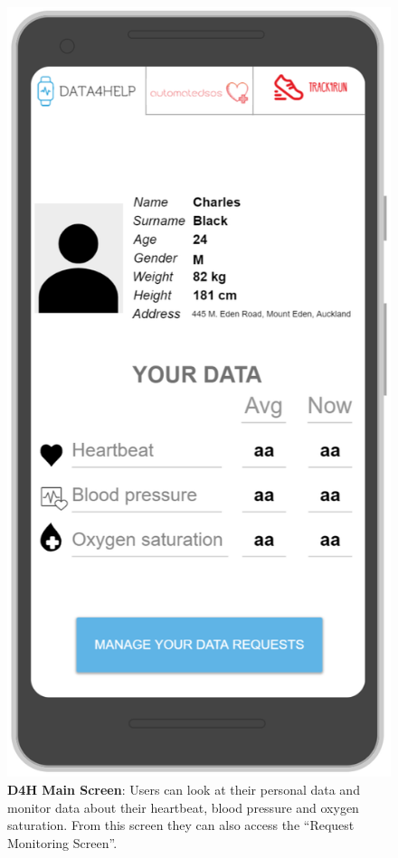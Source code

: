 \begin{figure}[H]
\centering
\includegraphics[scale = 0.5]{Mocks/Mobile_D4H_Main.PNG}
\caption{\textbf{D4H Main Screen}: Users can look at their personal data and monitor data about their heartbeat, blood pressure and oxygen saturation. From this screen they can also access the “Request Monitoring Screen”. }
\end{figure}

